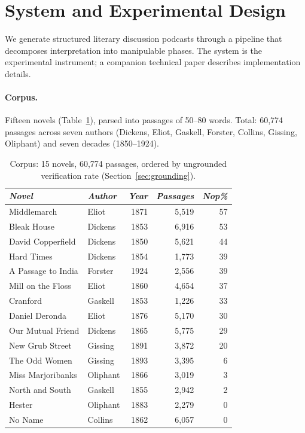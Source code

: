 \documentclass{article}
\begin{document}
\section{System and Experimental Design}
\label{sec:system}

We generate structured literary discussion podcasts through a pipeline
that decomposes interpretation into manipulable phases.  The system is
the experimental instrument; a companion technical paper describes
implementation details.

\paragraph{Corpus.}  Fifteen novels (Table~\ref{tab:novels}), parsed
into passages of 50--80 words.  Total: 60,774 passages across seven
authors (Dickens, Eliot, Gaskell, Forster, Collins, Gissing, Oliphant)
and seven decades (1850--1924).

\begin{table}[t]
\caption{Corpus: 15 novels, 60,774 passages, ordered by ungrounded
verification rate (Section~\ref{sec:grounding}).}
\label{tab:novels}
\begin{tabularx}{\textwidth}{X|l|r|r|r}
\toprule
\textit{Novel} & \textit{Author} & \textit{Year} & \textit{Passages} & \textit{Nop\%} \\
\midrule
Middlemarch          & Eliot    & 1871 & 5,519 & 57 \\
Bleak House          & Dickens  & 1853 & 6,916 & 53 \\
David Copperfield    & Dickens  & 1850 & 5,621 & 44 \\
Hard Times           & Dickens  & 1854 & 1,773 & 39 \\
A Passage to India   & Forster  & 1924 & 2,556 & 39 \\
Mill on the Floss    & Eliot    & 1860 & 4,654 & 37 \\
Cranford             & Gaskell  & 1853 & 1,226 & 33 \\
Daniel Deronda       & Eliot    & 1876 & 5,170 & 30 \\
Our Mutual Friend    & Dickens  & 1865 & 5,775 & 29 \\
New Grub Street      & Gissing  & 1891 & 3,872 & 20 \\
The Odd Women        & Gissing  & 1893 & 3,395 &  6 \\
Miss Marjoribanks    & Oliphant & 1866 & 3,019 &  3 \\
North and South      & Gaskell  & 1855 & 2,942 &  2 \\
Hester               & Oliphant & 1883 & 2,279 &  0 \\
No Name              & Collins  & 1862 & 6,057 &  0 \\
\bottomrule
\end{tabularx}
\end{table}
\end{document}
